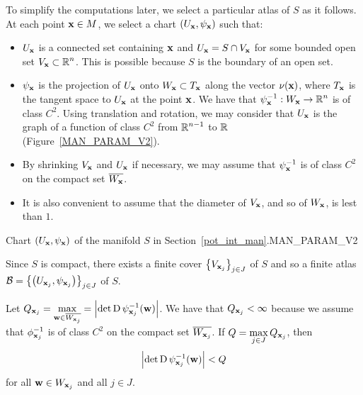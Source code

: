 To simplify the computations later, we select a particular atlas of
$S$ as it follows.  At each point $\mathbf{x} \in M$, we select a
chart $\displaystyle \left(U_{\mathbf{x}},\psi_{\mathbf{x}}\right)$ such
that:
\begin{itemize}
\item $\displaystyle U_{\mathbf{x}}$ is a connected set containing
$\mathbf{x}$ and $\displaystyle U_{\mathbf{x}} = S \cap V_{\mathbf{x}}$ for
some bounded open set $\displaystyle V_{\mathbf{x}} \subset \mathbb{R}^n$.  This is
possible because $S$ is the boundary of an open set.
\item $\displaystyle \psi_{\mathbf{x}}$ is the projection of
$\displaystyle U_{\mathbf{x}}$ onto
$\displaystyle W_{\mathbf{x}} \subset T_{\mathbf{x}}$ along the vector
$\nu(\mathbf{x})$, where $\displaystyle T_{\mathbf{x}}$ is the
tangent space to $\displaystyle U_{\mathbf{x}}$ at the point
$\mathbf{x}$.  We have that
$\displaystyle \psi_{\mathbf{x}}^{-1}: W_{\mathbf{x}} \to \mathbb{R}^n$ is of
class $\displaystyle C^2$.  Using translation and rotation, we may consider
that $\displaystyle U_{\mathbf{x}}$ is the graph
of a function of class $\displaystyle C^2$ from $\displaystyle \mathbb{R}^{n-1}$
to $\mathbb{R}$
(Figure~\ref{MAN_PARAM_V2}).
\item By shrinking $\displaystyle V_{\mathbf{x}}$ and $\displaystyle U_{\mathbf{x}}$
if necessary, we may assume that $\displaystyle \psi_{\mathbf{x}}^{-1}$ is of class
$\displaystyle C^2$ on the compact set $\displaystyle \overline{W_{\mathbf{x}}}$.
\item It is also convenient to assume that the diameter of
$V_{\mathbf{x}}$, and so of $W_{\mathbf{x}}$, is lest than $1$.
\end{itemize}

{Chart $\displaystyle (U_{\mathbf{x}},\psi_{\mathbf{x}})$ of the manifold $S$ in
Section~\ref{pot_int_man}.}{MAN_PARAM_V2}

Since $S$ is compact, there exists a finite cover
$\displaystyle \left\{ V_{\mathbf{x}_j} \right\}_{j\in J}$ of $S$
and so a finite atlas
$\displaystyle \mathcal{B}
= \left\{ \left(U_{\mathbf{x}_j}, \psi_{\mathbf{x}_j}\right) \right\}_{j\in J}$
of $S$.

Let $\displaystyle Q_{\mathbf{x}_j} = \max_{\mathbf{w} \in \overline{W_{\mathbf{x}_j}}}
= \left|\det \operatorname{D} \psi_{\mathbf{x}_j}^{-1}(\mathbf{w})\right|$.  We have that
$\displaystyle Q_{\mathbf{x}_j} < \infty$ because we assume that
$\displaystyle \phi_{\mathbf{x}_j}^{-1}$ is of class $\displaystyle C^2$
on the compact set $\displaystyle \overline{W_{\mathbf{x}_j}}$.
If $\displaystyle Q = \max_{j \in J} Q_{\mathbf{x}_j}$, then
\begin{equation} \label{defnQdetpsim1}
\left|\det \operatorname{D} \psi_{\mathbf{x}_j}^{-1}(\mathbf{w})\right| < Q
\end{equation}
for all $\displaystyle \mathbf{w} \in W_{\mathbf{x}_j}$ and all $j \in J$.

